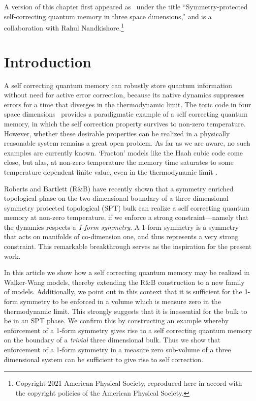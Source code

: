 A version of this chapter first appeared as~\cite{StahlNandkishore2021} under the title ``Symmetry-protected self-correcting quantum memory in three space dimensions," and is a collaboration with Rahul Nandkishore.\footnote{Copyright 2021 American Physical Society, reproduced here in accord with the copyright policies of the American Physical Society.}

\section{Introduction}
A self correcting quantum memory can robustly store quantum information without need for active error correction, because its native dynamics suppresses errors for a time that diverges in the thermodynamic limit. The toric code in four space dimensions~\cite{Kitaev2003Fault} provides a paradigmatic example of a self correcting quantum memory, in which the self correction property survives to non-zero temperature. However, whether these desirable properties can be realized in a physically reasonable system remains a great open problem. As far as we are aware, no such examples are currently known. `Fracton' models like the Haah cubic code \cite{Haah2011Code} come close, but alas, at non-zero temperature the memory time saturates to some temperature dependent finite value, even in the thermodynamic limit \cite{Siva2017Marginally, PremHaahNandkishore2017}. 

Roberts and Bartlett (R\&B) have recently shown \cite{RobertsBartlett2020} that a symmetry enriched topological phase on the two dimensional boundary of a three dimensional symmetry protected topological (SPT) bulk can realize a self correcting quantum memory at non-zero temperature, if we enforce a strong constraint---namely that the dynamics respects a {\it 1-form symmetry}. A 1-form symmetry \cite{Gaiotto2015Generalized, Lake2018Higher, Tong2018Gauge, Wen2019Higher, Qi2021Exotic} is a symmetry that acts on manifolds of co-dimension one, and thus represents a very strong constraint. This remarkable breakthrough serves as the inspiration for the present work. 

In this article we show how a self correcting quantum memory may be realized in Walker-Wang models, thereby extending the R\&B construction to a new family of models. Additionally, we point out in this context that it is sufficient for the 1-form symmetry to be enforced in a volume which is measure zero in the thermodynamic limit. This strongly suggests that it is inessential for the bulk to be in an SPT phase. We confirm this by constructing an example whereby enforcement of a 1-form symmetry gives rise to a self correcting quantum memory on the boundary of a {\it trivial} three dimensional bulk. Thus we show that enforcement of a 1-form symmetry in a measure zero sub-volume of a three dimensional system can be sufficient to give rise to self correction. 

